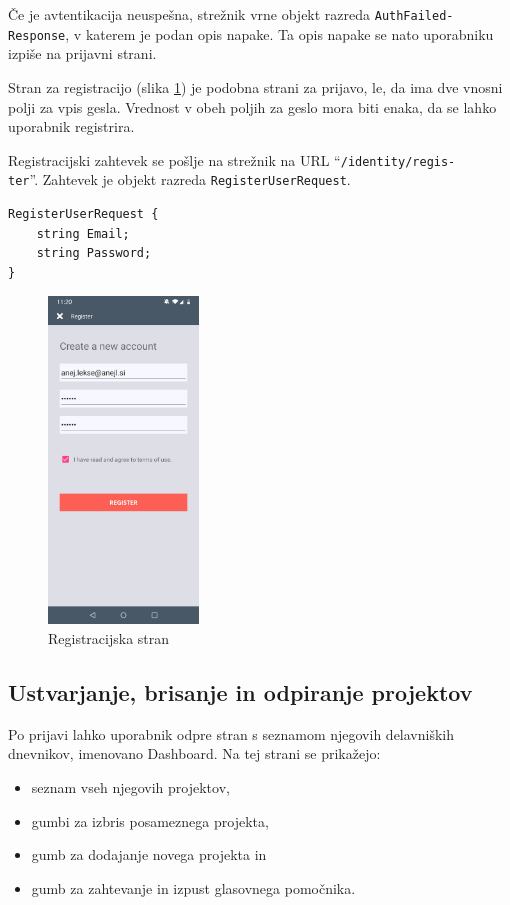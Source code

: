 \documentclass[a4paper, 12pt]{book}
\begin{document}
Če je avtentikacija neuspešna, strežnik vrne objekt razreda \texttt{AuthFailed-\\Response}, v katerem je podan opis napake.
Ta opis napake se nato uporabniku izpiše na prijavni strani.

Stran za registracijo (slika \ref{app_register}) je podobna strani za prijavo, le, da ima dve vnosni polji za vpis gesla.
Vrednost v obeh poljih za geslo mora biti enaka, da se lahko uporabnik registrira.

Registracijski zahtevek se pošlje na strežnik na URL \enquote{\texttt{/identity/regis-\\ter}}.
Zahtevek je objekt razreda \texttt{RegisterUserRequest}.

\begin{Verbatim}[commandchars=+\[\]]
RegisterUserRequest {
    string Email; 
    string Password;
}
\end{Verbatim}

\begin{figure}[H]
\begin{center}
\includegraphics[width=4cm]{app_register}
\end{center}
	\caption{Registracijska stran}
\label{app_register}
\end{figure}

\subsection{Ustvarjanje, brisanje in odpiranje projektov}

Po prijavi lahko uporabnik odpre stran s seznamom njegovih delavniških dnevnikov, imenovano Dashboard.
Na tej strani se prikažejo:
\begin{itemize}
	\item seznam vseh njegovih projektov, 
	\item gumbi za izbris posameznega projekta,
	\item gumb za dodajanje novega projekta in
	\item gumb za zahtevanje in izpust glasovnega pomočnika.
\end{itemize}
\end{document}
